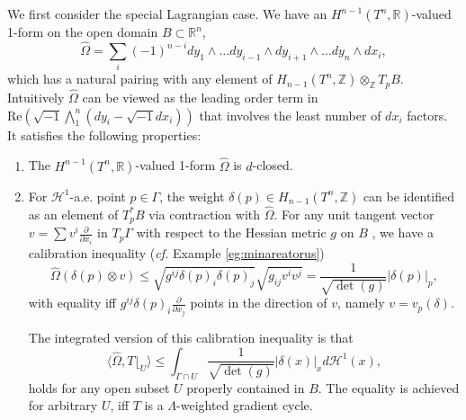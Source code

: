 \documentclass{article}
\theoremstyle{definition}
\newcommand{\cf}{\emph{cf.} }
\newcommand{\R}{\mathbb{R}}
\newcommand{\Z}{\mathbb{Z}}
\begin{document}
	
	We first consider the special Lagrangian case. We have an $H^{n-1}(T^n,\R)$-valued 1-form on the open domain $B\subset \R^n$,
	\[
	\hat{\Omega}=	\sum_i (-1)^{n-i}  dy_1\wedge \ldots dy_{i-1}\wedge dy_{i+1}\wedge \ldots dy_n \wedge  dx_i,
	\]
	which has a natural pairing with any element of $H_{n-1}(T^n,\Z) \otimes_\Z T_p B$. Intuitively  $\hat{\Omega}$ can be viewed as the leading order term in $\text{Re}(\sqrt{-1} \bigwedge_1^n(dy_i- \sqrt{-1} dx_i) )$ that involves the least number of $dx_i$ factors.
	It satisfies the following properties:
	\begin{enumerate}
		\item  The  $H^{n-1}(T^n,\R)$-valued 1-form $\hat{\Omega}$ is $d$-closed.
		
		
		
		\item For $\mathcal{H}^1$-a.e. point $p\in \Gamma$, the weight $\delta(p)\in H_{n-1}(T^n,\Z)$ can be identified as an element of $T_p ^*B$ via contraction with $\hat{\Omega}$. For any unit tangent vector  $v=\sum v^i \frac{\partial}{\partial x_i}$  in $T_p \Gamma$
		with respect to the Hessian metric $g$ on $B$ , we have a calibration inequality  (\cf Example \ref{eg:minareatorus})
		\begin{equation}\label{eqn:pointwisecalibration1}
			\hat{\Omega} ( \delta(p) \otimes v) \leq  \sqrt{g^{ij} \delta(p)_i \delta(p)_j }  \sqrt{ g_{ij} v^i v^j}=  \frac{1}{\sqrt{\det(g)} } |\delta(p)|_p,
		\end{equation}
		with equality iff 
		$ g^{ij} \delta(p)_i \frac{\partial}{\partial x_j}  $
		 points in the direction of $v$, namely $v= v_p(\delta)$.
	

		
		
		The integrated version of this calibration inequality is that
		\begin{equation}\label{eqn:integratedcalibration1}
			\langle  \hat{\Omega},   T \lfloor_U  \rangle \leq  \int_{\Gamma\cap U}  \frac{1}{  \sqrt{\det(g)} }  |\delta(x)|_x d\mathcal{H}^1 (x),
		\end{equation}
		holds for any open subset $U$ properly contained in $B$. The equality is achieved for arbitrary $U$,
		iff $T$ is a $\Lambda$-weighted gradient cycle.
		
		
		
		
		
		
	\end{enumerate}
	
	
	
	
	
	
	
\end{document}
